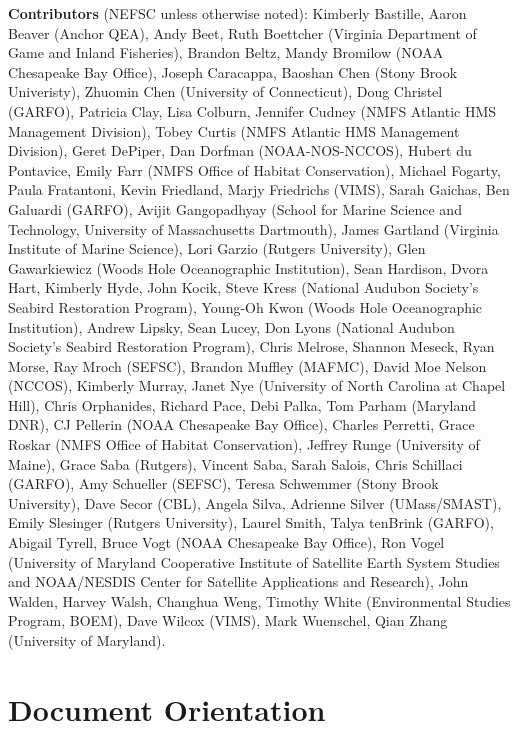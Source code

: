 \documentclass[
  10pt,
]{article}
\begin{document}
\textbf{Contributors} (NEFSC unless otherwise noted): Kimberly Bastille, Aaron Beaver (Anchor QEA), Andy Beet, Ruth Boettcher (Virginia Department of Game and Inland Fisheries), Brandon Beltz, Mandy Bromilow (NOAA Chesapeake Bay Office), Joseph Caracappa, Baoshan Chen (Stony Brook Univeristy), Zhuomin Chen (University of Connecticut), Doug Christel (GARFO), Patricia Clay, Lisa Colburn, Jennifer Cudney (NMFS Atlantic HMS Management Division), Tobey Curtis (NMFS Atlantic HMS Management Division), Geret DePiper, Dan Dorfman (NOAA-NOS-NCCOS), Hubert du Pontavice, Emily Farr (NMFS Office of Habitat Conservation), Michael Fogarty, Paula Fratantoni, Kevin Friedland, Marjy Friedrichs (VIMS), Sarah Gaichas, Ben Galuardi (GARFO), Avijit Gangopadhyay (School for Marine Science and Technology, University of Massachusetts Dartmouth), James Gartland (Virginia Institute of Marine Science), Lori Garzio (Rutgers University), Glen Gawarkiewicz (Woods Hole Oceanographic Institution), Sean Hardison, Dvora Hart, Kimberly Hyde, John Kocik, Steve Kress (National Audubon Society's Seabird Restoration Program), Young-Oh Kwon (Woods Hole Oceanographic Institution), Andrew Lipsky, Sean Lucey, Don Lyons (National Audubon Society's Seabird Restoration Program), Chris Melrose, Shannon Meseck, Ryan Morse, Ray Mroch (SEFSC), Brandon Muffley (MAFMC), David Moe Nelson (NCCOS), Kimberly Murray, Janet Nye (University of North Carolina at Chapel Hill), Chris Orphanides, Richard Pace, Debi Palka, Tom Parham (Maryland DNR), CJ Pellerin (NOAA Chesapeake Bay Office), Charles Perretti, Grace Roskar (NMFS Office of Habitat Conservation), Jeffrey Runge (University of Maine), Grace Saba (Rutgers), Vincent Saba, Sarah Salois, Chris Schillaci (GARFO), Amy Schueller (SEFSC), Teresa Schwemmer (Stony Brook University), Dave Secor (CBL), Angela Silva, Adrienne Silver (UMass/SMAST), Emily Slesinger (Rutgers University), Laurel Smith, Talya tenBrink (GARFO), Abigail Tyrell, Bruce Vogt (NOAA Chesapeake Bay Office), Ron Vogel (University of Maryland Cooperative Institute of Satellite Earth System Studies and NOAA/NESDIS Center for Satellite Applications and Research), John Walden, Harvey Walsh, Changhua Weng, Timothy White (Environmental Studies Program, BOEM), Dave Wilcox (VIMS), Mark Wuenschel, Qian Zhang (University of Maryland).

\newpage

\hypertarget{document-orientation}{%
\section{Document Orientation}\label{document-orientation}}
\end{document}
